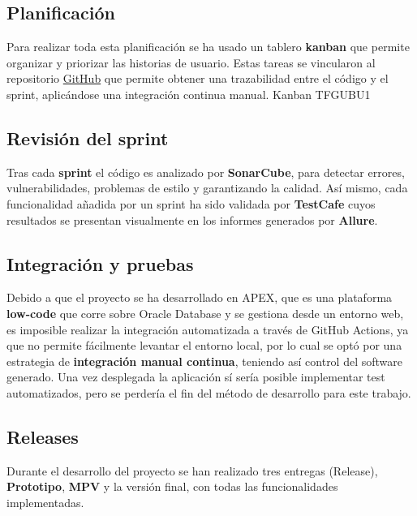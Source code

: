 \subsection{Planificación}
Para realizar toda esta planificación se ha usado un tablero \textbf{kanban}  que permite organizar y priorizar las historias de usuario. Estas tareas se vincularon al repositorio \href{https://github.com/far0010/TFGUBU-Fran_Arroyo}{GitHub} que permite obtener una trazabilidad entre el código y el sprint, aplicándose una integración continua manual.
 {Kanban TFGUBU}{1} \label{img: kanban}

\subsection{Revisión del sprint}
Tras cada \textbf{sprint} el código es analizado por \textbf{SonarCube}, para detectar errores, vulnerabilidades, problemas de estilo y garantizando la calidad. Así mismo, cada funcionalidad añadida por un sprint ha sido validada por \textbf{TestCafe} cuyos resultados se presentan visualmente en los informes generados por \textbf{Allure}. \label{img: allure}

\subsection{Integración y pruebas}
Debido a que el proyecto se ha desarrollado en \acrshort{APEX}, que es una plataforma \textbf{low-code} que corre sobre Oracle Database y se gestiona desde un entorno web, es imposible realizar la integración automatizada a través de GitHub Actions, ya que no permite fácilmente levantar el entorno local, por lo cual se optó por una estrategia de \textbf{integración manual continua}, teniendo así control del software generado. Una vez desplegada la aplicación sí sería posible implementar test automatizados, pero se perdería el fin del método de desarrollo para este trabajo.

\subsection{Releases}
Durante el desarrollo del proyecto se han realizado tres entregas (\gls{Release}), \textbf{Prototipo}, \textbf{\acrshort{MPV}} y la versión final, con todas las funcionalidades implementadas.

